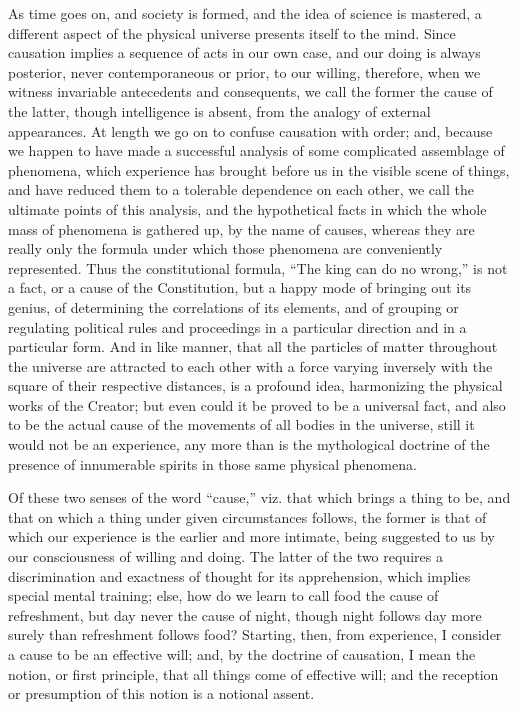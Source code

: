 As time goes on, and society is formed, and the idea of science is
mastered, a different aspect of the physical universe presents itself
to the mind. Since causation implies a sequence of acts in our own
case, and our doing is always posterior, never contemporaneous or
prior, to our willing, therefore, when we witness invariable
antecedents and consequents, we call the former the cause of the
latter, though intelligence is absent, from the analogy of external
appearances. At length we go on to confuse causation with order; and,
because we happen to have made a successful analysis of some
complicated assemblage of phenomena, which experience has brought
before us in the visible scene of things, and have reduced them to a
tolerable dependence on each other, we call the ultimate points of
this analysis, and the hypothetical facts in which the whole mass of
phenomena is gathered up, by the name of causes, whereas they are
really only the formula under which those phenomena are conveniently
represented. Thus the constitutional formula, ``The king can do no
wrong,'' is not a fact, or a cause of the Constitution, but a
happy mode of bringing out its genius, of determining the correlations
of its elements, and of grouping or regulating political rules and
proceedings in a particular direction and in a particular form. And in
like manner, that all the particles of matter throughout the universe
are attracted to each other with a force varying inversely with
the square of their respective distances, is a profound idea,
harmonizing the physical works of the Creator; but even could it be
proved to be a universal fact, and also to be the actual cause of the
movements of all bodies in the universe, still it would not be an
experience, any more than is the mythological doctrine of the presence
of innumerable spirits in those same physical phenomena.

Of these two senses of the word ``cause,'' viz. that which
brings a thing to be, and that on which a thing under given
circumstances follows, the former is that of which our experience is
the earlier and more intimate, being suggested to us by our
consciousness of willing and doing. The latter of the two requires a
discrimination and exactness of thought for its apprehension, which
implies special mental training; else, how do we learn to call food
the cause of refreshment, but day never the cause of night, though
night follows day more surely than refreshment follows food? Starting,
then, from experience, I consider a cause to be an effective will;
and, by the doctrine of causation, I mean the notion, or first
principle, that all things come of effective will; and the reception
or presumption of this notion is a notional assent.

